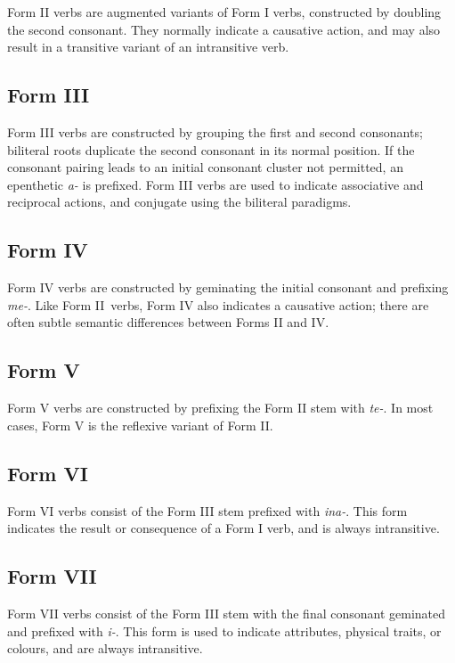 \documentclass[grammar]{subfiles}
\begin{document}
	Form II verbs are augmented variants of Form I verbs, constructed by doubling the second consonant. They normally indicate a causative action, and may also result in a transitive variant of an intransitive verb.

	\subsection{Form III}
	\label{sec:dev_verb_form_iii}

	Form III verbs are constructed by grouping the first and second consonants; biliteral roots duplicate the second consonant in its normal position. If the consonant pairing leads to an initial consonant cluster not permitted, an epenthetic \emph{a-} is prefixed. Form III verbs are used to indicate associative and reciprocal actions, and conjugate using the biliteral paradigms.

	\subsection{Form IV}
	\label{sec:dev_verb_form_iv}

	Form IV verbs are constructed by geminating the initial consonant and prefixing \emph{me-}. Like Form II verbs, Form IV also indicates a causative action; there are often subtle semantic differences between Forms II and IV.

	\subsection{Form V}
	\label{sec:dev_verb_form_v}

	Form V verbs are constructed by prefixing the Form II stem with \emph{te-}. In most cases, Form V is the reflexive variant of Form II.

	\subsection{Form VI}
	\label{sec:dev_verb_form_vi}

	Form VI verbs consist of the Form III stem prefixed with \emph{ina-}. This form indicates the result or consequence of a Form I verb, and is always intransitive.

	\subsection{Form VII}
	\label{sec:dev_verb_form_vii}

	Form VII verbs consist of the Form III stem with the final consonant geminated and prefixed with \emph{i-}. This form is used to indicate attributes, physical traits, or colours, and are always intransitive.
\end{document}
